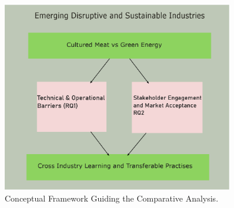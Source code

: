 \begin{figure}[h!]
	\centering
	\includegraphics[width=0.9\textwidth]{images/conceptual_Model.eps}
	\caption{Conceptual Framework Guiding the Comparative Analysis.}
	\label{fig:framework}
\end{figure}
	
	
